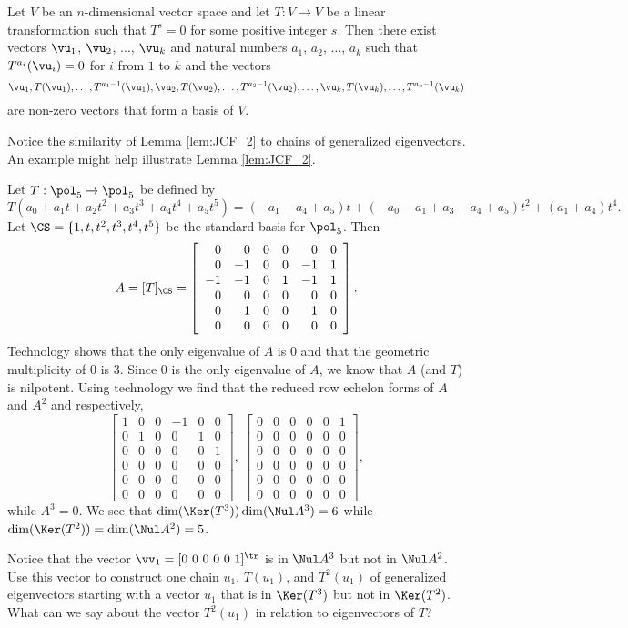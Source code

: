 \begin{lemma} \label{lem:JCF_2} Let $V$ be an $n$-dimensional vector space and let $T : V \to V$ be a linear transformation such that $T^s = 0$ for some positive integer $s$. Then there exist vectors $\vu_1$, $\vu_2$, $\ldots$, $\vu_k$ and natural numbers $a_1$, $a_2$, $\ldots$, $a_k$ such that $T^{a_i}(\vu_i) = 0$ for $i$ from $1$ to $k$ and the vectors
\[\vu_1, T(\vu_1), \ldots,T^{a_1-1}(\vu_1), \vu_2, T(\vu_2), \ldots,T^{a_2-1}(\vu_2), \ldots, \vu_k, T(\vu_k), \ldots,T^{a_k-1}(\vu_k)\]
are non-zero vectors that form a basis of $V$.
\end{lemma} 
 
Notice the similarity of Lemma \ref{lem:JCF_2} to chains of generalized eigenvectors. An example might help illustrate Lemma \ref{lem:JCF_2}.

\begin{activity} \label{act:JCF_Lem_2} Let $T: \pol_5 \to \pol_5$ be defined by 
\[T(a_0+a_1t+a_2t^2+a_3t^3+a_4t^4+a_5t^5) = (-a_1-a_4+a_5)t + (-a_0-a_1+a_3-a_4+a_5)t^2 + (a_1+a_4)t^4.\]
Let $\CS = \{1,t,t^2,t^3,t^4,t^5\}$ be the standard basis for $\pol_5$. Then
\[A = [T]_{\CS} = \left[ \begin{array}{rrccrc} 0&0&0&0&0&0 \\ 0&-1&0&0&-1&1 \\ -1&-1&0&1&-1&1 \\ 0&0&0&0&0&0 \\ 0&1&0&0&1&0 \\ 0&0&0&0&0&0 \end{array}\right].\]
Technology shows that the only eigenvalue of $A$ is $0$ and that the geometric multiplicity of $0$ is $3$. Since $0$ is the only eigenvalue of $A$, we know that $A$ (and $T$) is nilpotent. Using technology we find that the reduced row echelon forms of $A$ and $A^2$ and respectively, 
\[\left[ \begin{array}{cccrcc} 1&0&0&-1&0&0 \\ 0&1&0&0&1&0 \\ 0&0&0&0&0&1 \\ 0&0&0&0&0&0 \\ 0&0&0&0&0&0 \\ 0&0&0&0&0&0 \end{array} \right], \ \left[ \begin{array}{cccrcc} 0&0&0&0&0&1 \\ 0&0&0&0&0&0 \\ 0&0&0&0&0&0 \\ 0&0&0&0&0&0 \\ 0&0&0&0&0&0 \\ 0&0&0&0&0&0 \end{array} \right],\]
while $A^3 = 0$. We see that $\dim(\Ker(T^3)) \dim(\Nul A^3) = 6$ while $\dim(\Ker(T^2)) = \dim(\Nul A^2) = 5$. 
\ba
\item Notice that the vector $\vv_1 = [0 \ 0 \ 0 \ 0 \ 0 \ 1]^{\tr}$ is in $\Nul A^3$ but not in $\Nul A^2$. Use this vector to construct one chain $u_1$, $T(u_1)$, and $T^2(u_1)$ of generalized eigenvectors starting with a vector $u_1$ that is in $\Ker(T^3)$ but not in $\Ker(T^2)$. What can we say about the vector $T^2(u_1)$ in relation to eigenvectors of $T$? 


\end{activity}
